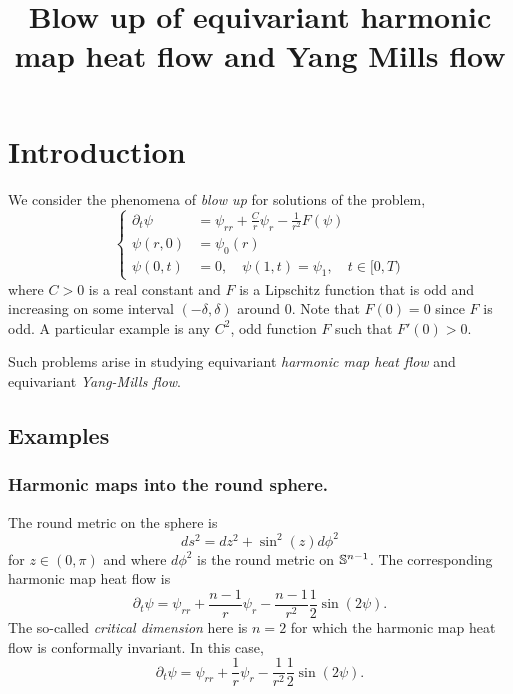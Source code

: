 \documentclass{amsart}
\begin{document}
\title[]
 {Blow up of equivariant harmonic map heat flow and Yang Mills flow}

\curraddr{}
\email{}

\dedicatory{}
\subjclass[2010]{}
\keywords{}

\begin{abstract}
\end{abstract}

\maketitle

\section{Introduction}
\label{sec:intro}

We consider the phenomena of \emph{blow up} for solutions of the problem,
\begin{equation}
\label{eq:pde}
\begin{cases}
\partial_t \psi &= \psi_{rr} + \frac{C}{r} \psi_r - \frac{1}{r^2} F(\psi) \\
\psi(r, 0) &= \psi_0(r) \\
\psi(0, t) &= 0, \quad \psi(1, t) = \psi_1, \quad t \in [0, T)
\end{cases}
\end{equation}
where \(C > 0\) is a real constant and \(F\) is a Lipschitz function that is odd and increasing on some interval \((-\delta, \delta)\) around \(0\). Note that \(F(0) = 0\) since \(F\) is odd. A particular example is any \(C^2\), odd function \(F\) such that \(F'(0) > 0\).

Such problems arise in studying equivariant \emph{harmonic map heat flow} and equivariant \emph{Yang-Mills flow}.

\subsection*{Examples}

\subsubsection*{Harmonic maps into the round sphere.}

The round metric on the sphere is
\[
ds^2 = dz^2 + \sin^2(z) d\phi^2
\]
for \(z \in (0, \pi)\) and where \(d\phi^2\) is the round metric on \(\S^{n-1}\). The corresponding harmonic map heat flow is
\[
\partial_t \psi = \psi_{rr} + \frac{n-1}{r} \psi_r - \frac{n-1}{r^2} \frac{1}{2} \sin (2\psi).
\]
The so-called \emph{critical dimension} here is \(n=2\) for which the harmonic map heat flow is conformally invariant. In this case,
\[
\partial_t \psi = \psi_{rr} + \frac{1}{r} \psi_r - \frac{1}{r^2} \frac{1}{2} \sin (2\psi).
\]
\end{document}

